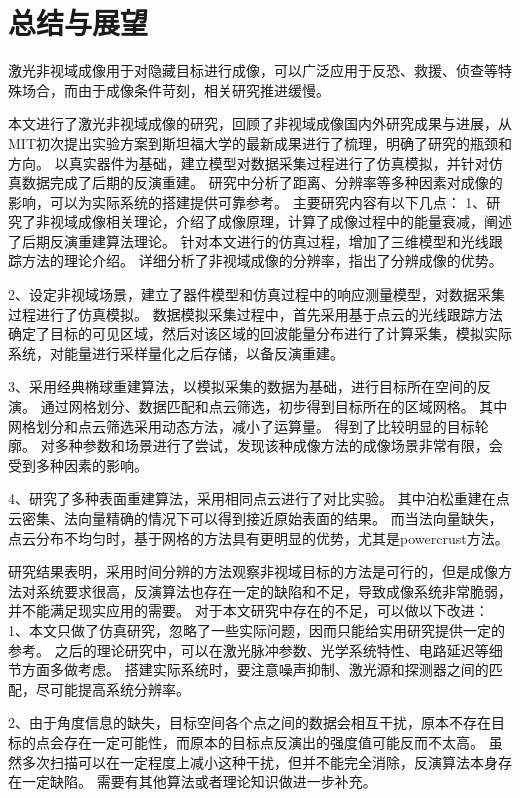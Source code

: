 \chapter{总结与展望}\label{chap:Conclusion}

激光非视域成像用于对隐藏目标进行成像，可以广泛应用于反恐、救援、侦查等特殊场合，而由于成像条件苛刻，相关研究推进缓慢。

本文进行了激光非视域成像的研究，回顾了非视域成像国内外研究成果与进展，从MIT初次提出实验方案到斯坦福大学的最新成果进行了梳理，明确了研究的瓶颈和方向。
以真实器件为基础，建立模型对数据采集过程进行了仿真模拟，并针对仿真数据完成了后期的反演重建。
研究中分析了距离、分辨率等多种因素对成像的影响，可以为实际系统的搭建提供可靠参考。
主要研究内容有以下几点：
1、研究了非视域成像相关理论，介绍了成像原理，计算了成像过程中的能量衰减，阐述了后期反演重建算法理论。
针对本文进行的仿真过程，增加了三维模型和光线跟踪方法的理论介绍。
详细分析了非视域成像的分辨率，指出了分辨成像的优势。

2、设定非视域场景，建立了器件模型和仿真过程中的响应测量模型，对数据采集过程进行了仿真模拟。
数据模拟采集过程中，首先采用基于点云的光线跟踪方法确定了目标的可见区域，然后对该区域的回波能量分布进行了计算采集，模拟实际系统，对能量进行采样量化之后存储，以备反演重建。

3、采用经典椭球重建算法，以模拟采集的数据为基础，进行目标所在空间的反演。
通过网格划分、数据匹配和点云筛选，初步得到目标所在的区域网格。
其中网格划分和点云筛选采用动态方法，减小了运算量。
得到了比较明显的目标轮廓。
对多种参数和场景进行了尝试，发现该种成像方法的成像场景非常有限，会受到多种因素的影响。

4、研究了多种表面重建算法，采用相同点云进行了对比实验。
其中泊松重建在点云密集、法向量精确的情况下可以得到接近原始表面的结果。
而当法向量缺失，点云分布不均匀时，基于网格的方法具有更明显的优势，尤其是powercrust方法。

研究结果表明，采用时间分辨的方法观察非视域目标的方法是可行的，但是成像方法对系统要求很高，反演算法也存在一定的缺陷和不足，导致成像系统非常脆弱，并不能满足现实应用的需要。
对于本文研究中存在的不足，可以做以下改进：
1、本文只做了仿真研究，忽略了一些实际问题，因而只能给实用研究提供一定的参考。
之后的理论研究中，可以在激光脉冲参数、光学系统特性、电路延迟等细节方面多做考虑。
搭建实际系统时，要注意噪声抑制、激光源和探测器之间的匹配，尽可能提高系统分辨率。

2、由于角度信息的缺失，目标空间各个点之间的数据会相互干扰，原本不存在目标的点会存在一定可能性，而原本的目标点反演出的强度值可能反而不太高。
虽然多次扫描可以在一定程度上减小这种干扰，但并不能完全消除，反演算法本身存在一定缺陷。
需要有其他算法或者理论知识做进一步补充。

